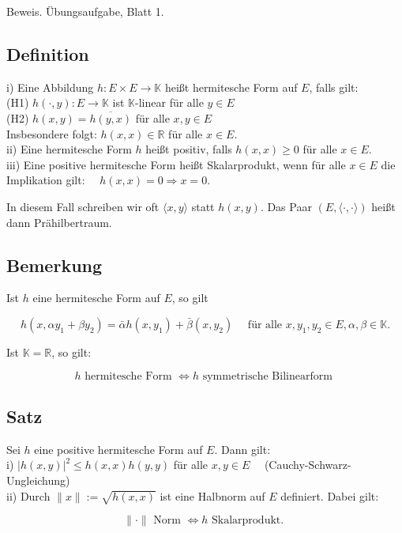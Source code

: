 \documentclass[10pt, letterpaper]{article}
\begin{document}
Beweis. Übungsaufgabe, Blatt 1.

\subsection*{Definition}
i) Eine Abbildung $h: E \times E \rightarrow \mathbb{K}$ heißt hermitesche Form auf $E$, falls gilt:\\
(H1) $h(\cdot, y): E \rightarrow \mathbb{K}$ ist $\mathbb{K}$-linear für alle $y \in E$\\
(H2) $h(x, y)=\overline{h(y, x)}$ für alle $x, y \in E$\\
Insbesondere folgt: $h(x, x) \in \mathbb{R}$ für alle $x \in E$.\\
ii) Eine hermitesche Form $h$ heißt positiv, falls $h(x, x) \geq 0$ für alle $x \in E$.\\
iii) Eine positive hermitesche Form heißt Skalarprodukt, wenn für alle $x \in E$ die Implikation gilt: $\quad h(x, x)=0 \Longrightarrow x=0$.

In diesem Fall schreiben wir oft $\langle x, y\rangle$ statt $h(x, y)$. Das Paar $(E,\langle\cdot, \cdot\rangle)$ heißt dann Prähilbertraum.

\subsection*{Bemerkung}
Ist $h$ eine hermitesche Form auf $E$, so gilt

$$
h\left(x, \alpha y_{1}+\beta y_{2}\right)=\bar{\alpha} h\left(x, y_{1}\right)+\bar{\beta}\left(x, y_{2}\right) \quad \text { für alle } x, y_{1}, y_{2} \in E, \alpha, \beta \in \mathbb{K} .
$$

Ist $\mathbb{K}=\mathbb{R}$, so gilt:

$$
h \text { hermitesche Form } \Longleftrightarrow h \text { symmetrische Bilinearform }
$$

\subsection*{Satz}
Sei $h$ eine positive hermitesche Form auf $E$. Dann gilt:\\
i) $|h(x, y)|^{2} \leq h(x, x) h(y, y)$ für alle $x, y \in E \quad$ (Cauchy-Schwarz-Ungleichung)\\
ii) Durch $\|x\|:=\sqrt{h(x, x)}$ ist eine Halbnorm auf $E$ definiert. Dabei gilt:

$$
\|\cdot\| \text { Norm } \Longleftrightarrow h \text { Skalarprodukt. }
$$
\end{document}
